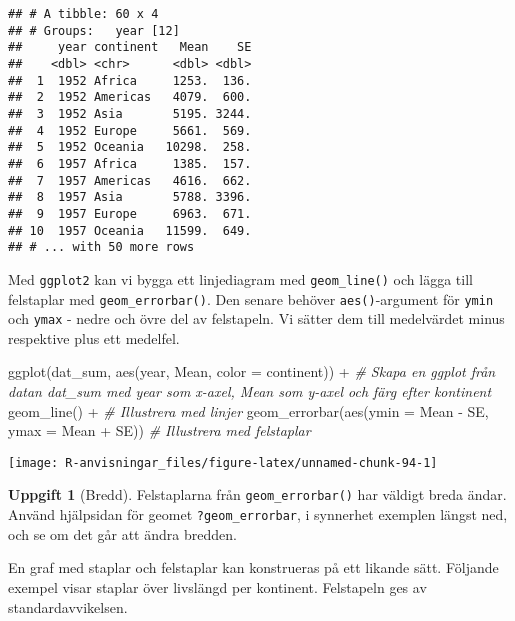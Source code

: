 \documentclass[
]{book}
\newenvironment{Shaded}{\begin{snugshade}}{\end{snugshade}}
\newcommand{\AttributeTok}[1]{\textcolor[rgb]{0.77,0.63,0.00}{#1}}
\newcommand{\CommentTok}[1]{\textcolor[rgb]{0.56,0.35,0.01}{\textit{#1}}}
\newcommand{\FunctionTok}[1]{\textcolor[rgb]{0.00,0.00,0.00}{#1}}
\newcommand{\NormalTok}[1]{#1}
\newcommand{\SpecialCharTok}[1]{\textcolor[rgb]{0.00,0.00,0.00}{#1}}
\theoremstyle{definition}
\theoremstyle{definition}
\theoremstyle{definition}
\newtheorem{exercise}{Uppgift}[chapter]
\theoremstyle{definition}
\theoremstyle{remark}
\begin{document}
\begin{verbatim}
## # A tibble: 60 x 4
## # Groups:   year [12]
##     year continent   Mean    SE
##    <dbl> <chr>      <dbl> <dbl>
##  1  1952 Africa     1253.  136.
##  2  1952 Americas   4079.  600.
##  3  1952 Asia       5195. 3244.
##  4  1952 Europe     5661.  569.
##  5  1952 Oceania   10298.  258.
##  6  1957 Africa     1385.  157.
##  7  1957 Americas   4616.  662.
##  8  1957 Asia       5788. 3396.
##  9  1957 Europe     6963.  671.
## 10  1957 Oceania   11599.  649.
## # ... with 50 more rows
\end{verbatim}

Med \texttt{ggplot2} kan vi bygga ett linjediagram med \texttt{geom\_line()} och lägga till felstaplar med \texttt{geom\_errorbar()}. Den senare behöver \texttt{aes()}-argument för \texttt{ymin} och \texttt{ymax} - nedre och övre del av felstapeln. Vi sätter dem till medelvärdet minus respektive plus ett medelfel.

\begin{Shaded}
\begin{Highlighting}[]
\FunctionTok{ggplot}\NormalTok{(dat\_sum, }\FunctionTok{aes}\NormalTok{(year, Mean, }\AttributeTok{color =}\NormalTok{ continent)) }\SpecialCharTok{+}      \CommentTok{\# Skapa en ggplot från datan dat\_sum med year som x{-}axel, Mean som y{-}axel och färg efter kontinent}
  \FunctionTok{geom\_line}\NormalTok{() }\SpecialCharTok{+}                                            \CommentTok{\# Illustrera med linjer}
  \FunctionTok{geom\_errorbar}\NormalTok{(}\FunctionTok{aes}\NormalTok{(}\AttributeTok{ymin =}\NormalTok{ Mean }\SpecialCharTok{{-}}\NormalTok{ SE, }\AttributeTok{ymax =}\NormalTok{ Mean }\SpecialCharTok{+}\NormalTok{ SE))   }\CommentTok{\# Illustrera med felstaplar}
\end{Highlighting}
\end{Shaded}

\begin{center}\texttt{[image: R-anvisningar\_files/figure-latex/unnamed-chunk-94-1]} \end{center}

\begin{exercise}[Bredd]
Felstaplarna från \texttt{geom\_errorbar()} har väldigt breda ändar. Använd hjälpsidan för geomet \texttt{?geom\_errorbar}, i synnerhet exemplen längst ned, och se om det går att ändra bredden.
\end{exercise}

En graf med staplar och felstaplar kan konstrueras på ett likande sätt. Följande exempel visar staplar över livslängd per kontinent. Felstapeln ges av standardavvikelsen.
\end{document}
